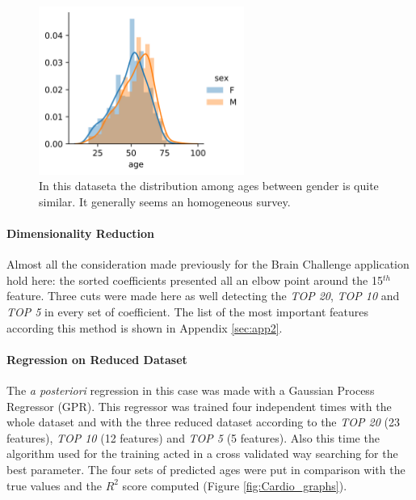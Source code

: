 \documentclass{article}
\begin{document}
\begin{figure}[ht]
	\centerline{\includegraphics[width=0.6\textwidth]{Cardio_distribution}}
	\caption{ In this dataseta the distribution among ages between gender is quite similar. It generally seems an homogeneous survey.}
	\label{fig:cardio_distr}
	\centering
\end{figure}


\paragraph{Dimensionality Reduction} Almost all the consideration made previously for the Brain Challenge application hold here: the sorted coefficients presented all an elbow point around the 15$^{th}$ feature. Three cuts were made here as well detecting the \emph{TOP 20}, \emph{TOP 10} and \emph{TOP 5} in every set of coefficient. The list of the most important features according this method is shown in Appendix \ref{sec:app2}.

\paragraph{Regression on Reduced Dataset} The \emph{a posteriori} regression in this case was made with a Gaussian Process Regressor (GPR). This regressor was trained four independent times with the whole dataset and with the three reduced dataset according to the \emph{TOP 20} (23 features), \emph{TOP 10} (12 features)  and \emph{TOP 5} (5 features). Also this time the algorithm used for the training acted in a cross validated way searching for the best parameter. The four sets of predicted ages were put in comparison with the true values and the $R^2$ score computed (Figure \ref{fig:Cardio_graphs}).
\end{document}
